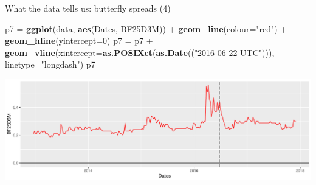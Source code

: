 \documentclass[ignorenonframetext,aspectratio=169]{beamer}
\newenvironment{Shaded}{}{}
\newcommand{\KeywordTok}[1]{\textcolor[rgb]{0.00,0.44,0.13}{\textbf{#1}}}
\newcommand{\DataTypeTok}[1]{\textcolor[rgb]{0.56,0.13,0.00}{#1}}
\newcommand{\DecValTok}[1]{\textcolor[rgb]{0.25,0.63,0.44}{#1}}
\newcommand{\StringTok}[1]{\textcolor[rgb]{0.25,0.44,0.63}{#1}}
\newcommand{\OperatorTok}[1]{\textcolor[rgb]{0.40,0.40,0.40}{#1}}
\newcommand{\NormalTok}[1]{#1}
\begin{document}
\begin{frame}[fragile]{What the data tells us: butterfly spreads (4)}

\begin{Shaded}
\begin{Highlighting}[]
\NormalTok{p7 =}\StringTok{ }\KeywordTok{ggplot}\NormalTok{(data, }\KeywordTok{aes}\NormalTok{(Dates, BF25D3M)) }\OperatorTok{+}\StringTok{ }\KeywordTok{geom_line}\NormalTok{(}\DataTypeTok{colour=}\StringTok{"red"}\NormalTok{) }\OperatorTok{+}\StringTok{ }
\StringTok{        }\KeywordTok{geom_hline}\NormalTok{(}\DataTypeTok{yintercept=}\DecValTok{0}\NormalTok{)}
\NormalTok{p7 =}\StringTok{ }\NormalTok{p7 }\OperatorTok{+}\StringTok{ }\KeywordTok{geom_vline}\NormalTok{(}\DataTypeTok{xintercept=}\KeywordTok{as.POSIXct}\NormalTok{(}\KeywordTok{as.Date}\NormalTok{((}\StringTok{"2016-06-22 UTC"}\NormalTok{))),}
                     \DataTypeTok{linetype=}\StringTok{"longdash"}\NormalTok{)}
\NormalTok{p7}
\end{Highlighting}
\end{Shaded}

\begin{center}\includegraphics[width=1\linewidth]{2018_02_07_IMF_FXCourse_files/figure-beamer/unnamed-chunk-18-1} \end{center}

\end{frame}
\end{document}
